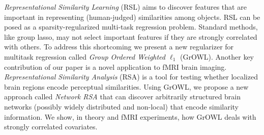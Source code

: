 {\em Representational Similarity Learning} (RSL) aims to discover features that are
important in representing (human-judged) similarities among objects.  RSL can be posed as
a sparsity-regularized multi-task regression problem. Standard methods, like group lasso,
may not select important features if they are strongly correlated with others. To address
this shortcoming we present a new regularizer for multitask regression called \emph{Group
  Ordered Weighted $\ell_1$} (GrOWL). Another key contribution of our paper is a novel
application to fMRI brain imaging. \emph{Representational Similarity Analysis} (RSA) is a
tool for testing whether localized brain regions encode perceptual similarities. Using
GrOWL, we propose a new approach called {\em Network RSA} that can discover arbitrarily
structured brain networks (possibly widely distributed and non-local) that encode
similarity information. We show, in theory and fMRI experiments, how GrOWL deals with
strongly correlated covariates.

